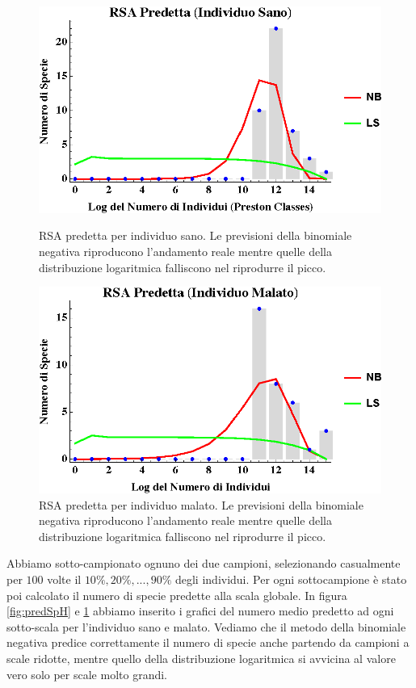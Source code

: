 \begin{figure}[H]
  \centering
  \begin{minipage}[t]{0.45\textwidth}
    \includegraphics[width=\textwidth]{Figure/rsapredH.eps}
    \caption{RSA predetta per individuo sano. Le previsioni della binomiale negativa riproducono l'andamento reale mentre quelle della distribuzione logaritmica falliscono nel riprodurre il picco.}
    \label{fig:rsapredH}
   \end{minipage}
  \hfill
  \begin{minipage}[t]{0.45\textwidth}
    \includegraphics[width=\textwidth]{Figure/rsapredC.eps}
    \caption{RSA predetta per individuo malato. Le previsioni della binomiale negativa riproducono l'andamento reale mentre quelle della distribuzione logaritmica falliscono nel riprodurre il picco.}
    \label{fig:rsapredC}
    \end{minipage}
\end{figure}

Abbiamo sotto-campionato ognuno dei due campioni, selezionando casualmente per $100$ volte il $10 \%, 20 \%,...,90 \%$ degli individui. Per ogni sottocampione è stato poi calcolato il numero di specie predette alla scala globale. In figura \ref{fig:predSpH} e \ref{fig:rsapredC} abbiamo inserito i grafici del numero medio predetto ad ogni sotto-scala per l'individuo sano e malato. Vediamo che il metodo della binomiale negativa predice correttamente il numero di specie anche partendo da campioni a scale ridotte, mentre quello della distribuzione logaritmica si avvicina al valore vero solo per scale molto grandi.

